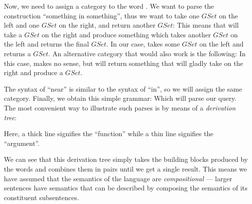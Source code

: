 \documentclass[main.tex]{subfiles}
\begin{document}
Now, we need to assign a category to the word . We want to parse
the construction ``something in something'', thus we want to take one $GSet$
on the left and one $GSet$ on the right, and return another $GSet$:
This means that  will take a $GSet$ on the right and produce something
which takes another $GSet$ on the left and returns the final $GSet$.
In our case,  takes some $GSet$ on the left and
returns a $GSet$.
An alternative category that would also work is the following:
In this case,  makes no sense, but 
will return something that will gladly take  on the right and
produce a $GSet$.

The syntax of ``near'' is similar to the syntax of ``in'', so we will assign
the same category. Finally, we obtain this simple grammar:
Which will parse our query. The most convenient way to illustrate such parses
is by means of a \emph{derivation tree}:

Here, a thick line signifies the ``function'' while a thin line signifies the
``argument''.

We can see that this derivation tree simply takes the building blocks produced
by the words and combines them in pairs until we get a single result. This means
we have assumed that the semantics of the language are \emph{compositional} ---
larger sentences have semantics that can be described by composing the semantics
of its constituent subsentences.
\end{document}
